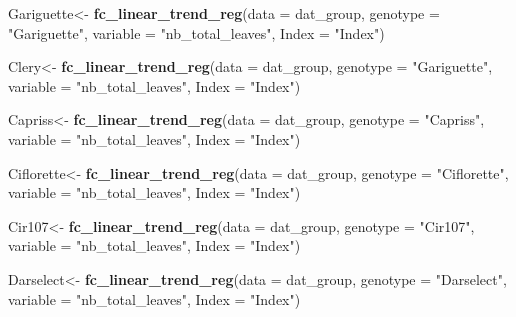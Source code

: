 \documentclass[]{article}
\newenvironment{Shaded}{\begin{snugshade}}{\end{snugshade}}
\newcommand{\KeywordTok}[1]{\textcolor[rgb]{0.13,0.29,0.53}{\textbf{#1}}}
\newcommand{\DataTypeTok}[1]{\textcolor[rgb]{0.13,0.29,0.53}{#1}}
\newcommand{\StringTok}[1]{\textcolor[rgb]{0.31,0.60,0.02}{#1}}
\newcommand{\NormalTok}[1]{#1}
\begin{document}
\begin{Shaded}
\begin{Highlighting}[]
\NormalTok{Gariguette<-}\StringTok{ }\KeywordTok{fc_linear_trend_reg}\NormalTok{(}\DataTypeTok{data =}\NormalTok{ dat_group,}
                                 \DataTypeTok{genotype =} \StringTok{"Gariguette"}\NormalTok{,}
                                 \DataTypeTok{variable =} \StringTok{"nb_total_leaves"}\NormalTok{,}
                                 \DataTypeTok{Index =} \StringTok{"Index"}\NormalTok{)}

\NormalTok{Clery<-}\StringTok{ }\KeywordTok{fc_linear_trend_reg}\NormalTok{(}\DataTypeTok{data =}\NormalTok{ dat_group,}
                            \DataTypeTok{genotype =} \StringTok{"Gariguette"}\NormalTok{,}
                            \DataTypeTok{variable =} \StringTok{"nb_total_leaves"}\NormalTok{,}
                            \DataTypeTok{Index =} \StringTok{"Index"}\NormalTok{)}

\NormalTok{Capriss<-}\StringTok{ }\KeywordTok{fc_linear_trend_reg}\NormalTok{(}\DataTypeTok{data =}\NormalTok{ dat_group,}
                              \DataTypeTok{genotype =} \StringTok{"Capriss"}\NormalTok{,}
                              \DataTypeTok{variable =} \StringTok{"nb_total_leaves"}\NormalTok{,}
                              \DataTypeTok{Index =} \StringTok{"Index"}\NormalTok{)}

\NormalTok{Ciflorette<-}\StringTok{ }\KeywordTok{fc_linear_trend_reg}\NormalTok{(}\DataTypeTok{data =}\NormalTok{ dat_group,}
                                 \DataTypeTok{genotype =} \StringTok{"Ciflorette"}\NormalTok{,}
                                 \DataTypeTok{variable =} \StringTok{"nb_total_leaves"}\NormalTok{,}
                                 \DataTypeTok{Index =} \StringTok{"Index"}\NormalTok{)}

\NormalTok{Cir107<-}\StringTok{ }\KeywordTok{fc_linear_trend_reg}\NormalTok{(}\DataTypeTok{data =}\NormalTok{ dat_group,}
                             \DataTypeTok{genotype =} \StringTok{"Cir107"}\NormalTok{,}
                             \DataTypeTok{variable =} \StringTok{"nb_total_leaves"}\NormalTok{,}
                             \DataTypeTok{Index =} \StringTok{"Index"}\NormalTok{)}

\NormalTok{Darselect<-}\StringTok{ }\KeywordTok{fc_linear_trend_reg}\NormalTok{(}\DataTypeTok{data =}\NormalTok{ dat_group,}
                                \DataTypeTok{genotype =} \StringTok{"Darselect"}\NormalTok{,}
                                \DataTypeTok{variable =} \StringTok{"nb_total_leaves"}\NormalTok{,}
                                \DataTypeTok{Index =} \StringTok{"Index"}\NormalTok{)}


\end{Highlighting}
\end{Shaded}
\end{document}
